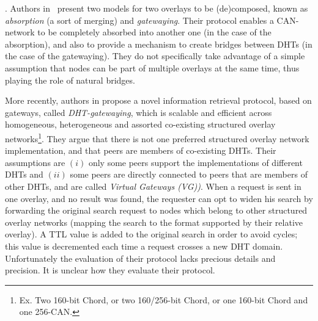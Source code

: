 %
.
%
Authors in~\cite{cheng2006tdh} present two models for two overlays
to be (de)composed, known as \textit{absorption} (a sort of merging)
and \textit{gatewaying}.  Their protocol enables a CAN-network to be
completely absorbed into another one (in the case of the absorption),
and also to provide a mechanism to create bridges between DHTs (in the
case of the gatewaying). They do not specifically take advantage of a
simple assumption that nodes can be part of multiple overlays at  the
same time, thus playing the role of natural bridges.

More recently, authors in \cite{cheng_bridging_2007} propose a novel
information retrieval protocol, based on gateways, called
\emph{DHT-gatewaying}, which is scalable and efficient across
homogeneous, heterogeneous and assorted co-existing structured overlay
networks\footnote{Ex.  Two 160-bit Chord, or two 160/256-bit Chord, or
  one 160-bit Chord and one 256-CAN.}.  They argue that there is not one
preferred structured overlay network implementation, and that peers
are members of co-existing DHTs. Their assumptions are $(i)$ only some
peers support the implementations of different DHTs and $(ii)$ some
peers are directly connected to peers that are members of other DHTs,
and are called \textit{Virtual Gateways (VG))}. When a request is sent
in one overlay, and no result was found, the requester can opt to
widen his search by forwarding the original search request to nodes
which belong to other structured overlay networks (mapping the search
to the format supported by their relative overlay). A TTL value is
added to the original search in order to avoid cycles; this value is
decremented each time a request crosses a new DHT
domain. Unfortunately the evaluation of their protocol lacks precious
details and precision. It is unclear how they evaluate their protocol.



